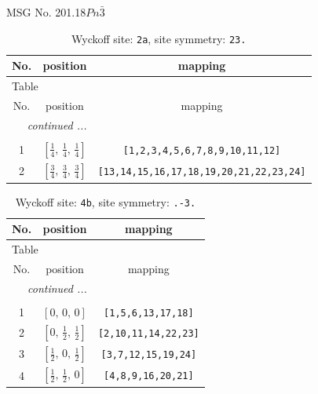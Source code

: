 \documentclass[fleqn,8pt]{jsarticle}
\begin{document}
\setcounter{MaxMatrixCols}{32}

\renewcommand{\tablename}{Table~}
\renewcommand{\figurename}{Figure~}
\begin{center}
\LARGE
MSG No. 201.18\quad$Pn\bar{3}$
\end{center}
\renewcommand{\arraystretch}{1.2}
\begin{longtable}{ccc}
\caption{Wyckoff site: {\tt 2a}, site symmetry: {\tt 23.}}
 \\
 \hline \hline
No. & position & mapping \\ \hline \endfirsthead

\multicolumn{2}{l}{\tablename\ \thetable{}} \\
 \hline \hline
No. & position & mapping \\ \hline \endhead

 \hline \hline
\multicolumn{2}{r}{\footnotesize\it continued ...} \\ \endfoot

 \hline \hline
\multicolumn{2}{r}{} \\ \endlastfoot

1 & $\left[ \frac{1}{4},\, \frac{1}{4},\, \frac{1}{4} \right]$ & {\tt [1,2,3,4,5,6,7,8,9,10,11,12]} \\ \hline
2 & $\left[ \frac{3}{4},\, \frac{3}{4},\, \frac{3}{4} \right]$ & {\tt [13,14,15,16,17,18,19,20,21,22,23,24]} \\
\end{longtable}
\renewcommand{\arraystretch}{1.2}
\begin{longtable}{ccc}
\caption{Wyckoff site: {\tt 4b}, site symmetry: {\tt .-3.}}
 \\
 \hline \hline
No. & position & mapping \\ \hline \endfirsthead

\multicolumn{2}{l}{\tablename\ \thetable{}} \\
 \hline \hline
No. & position & mapping \\ \hline \endhead

 \hline \hline
\multicolumn{2}{r}{\footnotesize\it continued ...} \\ \endfoot

 \hline \hline
\multicolumn{2}{r}{} \\ \endlastfoot

1 & $\left[ 0,\, 0,\, 0 \right]$ & {\tt [1,5,6,13,17,18]} \\ \hline
2 & $\left[ 0,\, \frac{1}{2},\, \frac{1}{2} \right]$ & {\tt [2,10,11,14,22,23]} \\ \hline
3 & $\left[ \frac{1}{2},\, 0,\, \frac{1}{2} \right]$ & {\tt [3,7,12,15,19,24]} \\ \hline
4 & $\left[ \frac{1}{2},\, \frac{1}{2},\, 0 \right]$ & {\tt [4,8,9,16,20,21]} \\
\end{longtable}
\end{document}
